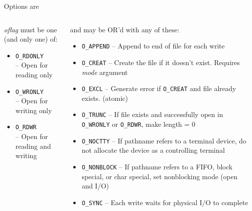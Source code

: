 \documentclass[newPxFont,sthlmFooter,nooffset]{beamer}
\begin{document}
\begin{frame}[t]{Options are}
\begin{columns}[t]
\begin{column}{0.30\linewidth}
\small \textit{oflag} must be one (and only one) of:
\footnotesize
\begin{itemize}
	\item \texttt{O\_RDONLY}\\ -- Open for reading only
	\item \texttt{O\_WRONLY}\\ -- Open for writing only
	\item \texttt{O\_RDWR}\\ -- Open for reading and writing
\end{itemize}
\end{column}
\begin{column}{0.70\linewidth}
\small and may be OR'd with any of these:
\footnotesize
\begin{itemize}
	\item \texttt{O\_APPEND} -- Append to end of file for each write
	\item \texttt{O\_CREAT} -- Create the file if it doesn't exist. Requires
		{\em mode} argument
	\item \texttt{O\_EXCL} -- Generate error if \texttt{O\_CREAT} and file
		already exists. (atomic)
	\item \texttt{O\_TRUNC} -- If file exists and successfully open in
		\texttt{O\_WRONLY} or \texttt{O\_RDWR}, make length = 0
	\item \texttt{O\_NOCTTY} -- If pathname refers to a terminal device, do
		not allocate the device as a controlling terminal
	\item \texttt{O\_NONBLOCK} -- If pathname refers to a FIFO, block special,
		or char special, set nonblocking mode (open and I/O)
	\item \texttt{O\_SYNC} --  Each write waits for physical I/O to complete
\end{itemize}
\end{column}
\end{columns}
\end{frame}
\end{document}
